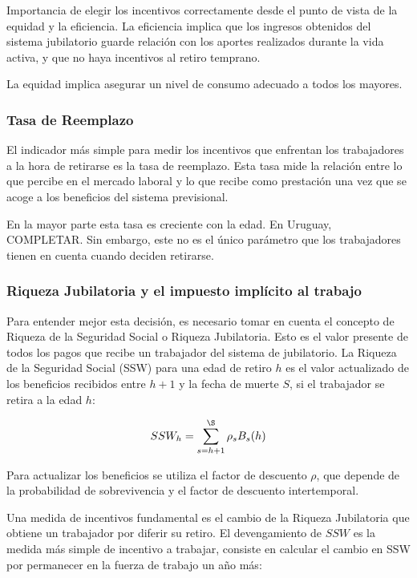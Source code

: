 \documentclass[]{article}
\begin{document}
Importancia de elegir los incentivos correctamente desde el punto de
vista de la equidad y la eficiencia. La eficiencia implica que los
ingresos obtenidos del sistema jubilatorio guarde relación con los
aportes realizados durante la vida activa, y que no haya incentivos al
retiro temprano.

La equidad implica asegurar un nivel de consumo adecuado a todos los
mayores.

\hypertarget{tasa-de-reemplazo}{%
\subsubsection{Tasa de Reemplazo}\label{tasa-de-reemplazo}}

El indicador más simple para medir los incentivos que enfrentan los
trabajadores a la hora de retirarse es la tasa de reemplazo. Esta tasa
mide la relación entre lo que percibe en el mercado laboral y lo que
recibe como prestación una vez que se acoge a los beneficios del sistema
previsional.

En la mayor parte esta tasa es creciente con la edad. En Uruguay,
COMPLETAR. Sin embargo, este no es el único parámetro que los
trabajadores tienen en cuenta cuando deciden retirarse.

\hypertarget{riqueza-jubilatoria-y-el-impuesto-impluxedcito-al-trabajo}{%
\subsubsection{Riqueza Jubilatoria y el impuesto implícito al
trabajo}\label{riqueza-jubilatoria-y-el-impuesto-impluxedcito-al-trabajo}}

Para entender mejor esta decisión, es necesario tomar en cuenta el
concepto de Riqueza de la Seguridad Social o Riqueza Jubilatoria. Esto
es el valor presente de todos los pagos que recibe un trabajador del
sistema de jubilatorio. La Riqueza de la Seguridad Social (SSW) para una
edad de retiro \(h\) es el valor actualizado de los beneficios recibidos
entre \(h + 1\) y la fecha de muerte \(S\), si el trabajador se retira a
la edad \(h\):

\[ SSW_{h} = \sum_{s=h+1}^{\S} \rho_{s} B_{s}(h)\]

Para actualizar los beneficios se utiliza el factor de descuento
\(\rho\), que depende de la probabilidad de sobrevivencia y el factor de
descuento intertemporal.

Una medida de incentivos fundamental es el cambio de la Riqueza
Jubilatoria que obtiene un trabajador por diferir su retiro. El
devengamiento de \(SSW\) es la medida más simple de incentivo a
trabajar, consiste en calcular el cambio en SSW por permanecer en la
fuerza de trabajo un año más:
\end{document}
